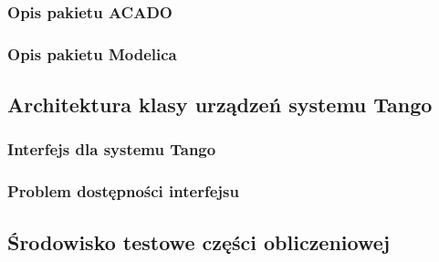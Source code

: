 \subsubsection{Opis pakietu ACADO}


\subsubsection{Opis pakietu Modelica}



\subsection{Architektura klasy urządzeń systemu Tango}
\label{sub:czesc-wyzsza-klasa}


\subsubsection{Interfejs dla systemu Tango}


\subsubsection{Problem dostępności interfejsu}



\subsection{Środowisko testowe części obliczeniowej}
\label{sub:czesc-wyzsza-docker}